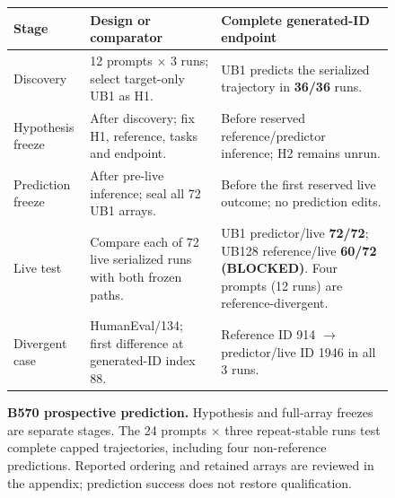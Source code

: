 \begin{figure}[t]
\centering
\small
\begin{tabular}{@{}p{0.95in}p{2.12in}p{3.08in}@{}}
\toprule
Stage & Design or comparator & Complete generated-ID endpoint \\
\midrule
Discovery & 12 prompts $\times$ 3 runs; select target-only UB1 as H1. & UB1 predicts the serialized trajectory in \textbf{36/36} runs. \\
Hypothesis freeze & After discovery; fix H1, reference, tasks and endpoint. & Before reserved reference/predictor inference; H2 remains unrun. \\
Prediction freeze & After pre-live inference; seal all 72 UB1 arrays. & Before the first reserved live outcome; no prediction edits. \\
Live test & Compare each of 72 live serialized runs with both frozen paths. & UB1 predictor/live \textbf{72/72}; UB128 reference/live \textbf{60/72 (BLOCKED)}. Four prompts (12 runs) are reference-divergent. \\
Divergent case & HumanEval/134; first difference at generated-ID index 88. & Reference ID 914 $\rightarrow$ predictor/live ID 1946 in all 3 runs. \\
\bottomrule
\end{tabular}
\caption{\textbf{B570 prospective prediction.} Hypothesis and full-array freezes are separate stages. The 24 prompts $\times$ three repeat-stable runs test complete capped trajectories, including four non-reference predictions. Reported ordering and retained arrays are reviewed in the appendix; prediction success does not restore qualification.}
\label{fig:translation}
\end{figure}

